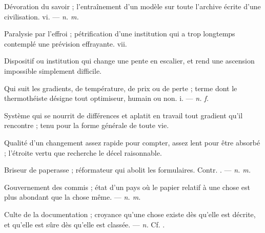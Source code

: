  Dévoration du savoir ; l'entraînement d'un modèle sur toute l'archive écrite d'une civilisation.   vi. ---  \textit{n. m.}

 Paralysie par l'effroi ; pétrification d'une institution qui a trop longtemps contemplé une prévision effrayante.   vii.

 Dispositif ou institution qui change une pente en escalier, et rend une ascension impossible simplement difficile. 

 Qui suit les gradients, de température, de prix ou de perte ; terme dont le thermothéiste désigne tout optimiseur, humain ou non.   i. ---  \textit{n. f.}

 Système qui se nourrit de différences et aplatit en travail tout gradient qu'il rencontre ; tenu pour la forme générale de toute vie.

 Qualité d'un changement assez rapide pour compter, assez lent pour être absorbé ; l'étroite vertu que recherche le décel raisonnable.

 Briseur de paperasse ; réformateur qui abolit les formulaires. Contr. . ---  \textit{n. m.}

 Gouvernement des commis ; état d'un pays où le papier relatif à une chose est plus abondant que la chose même. ---  \textit{n. m.}

 Culte de la documentation ; croyance qu'une chose existe dès qu'elle est décrite, et qu'elle est sûre dès qu'elle est classée. ---  \textit{n.} Cf. .

